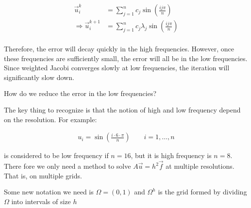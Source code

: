 \begin{align*}
  \vec{u}_i^{k} &= \sum_{j=1}^n c_j \sin \left( \frac{ij\pi}{n} \right) \\
  \Rightarrow \vec{u}_i^{k+1} &= \sum_{j=1}^n c_j \lambda_j \sin \left( \frac{ij\pi}{n} \right) \\
\end{align*}

Therefore, the error will decay quickly in the high frequencies. However, once
these frequencies are sufficiently small, the error will all be in the low
frequencies. Since weighted Jacobi converges slowly at low frequencies, the
iteration will significantly slow down.

\begin{displayquote}
How do we reduce the error in the low frequencies?
\end{displayquote}

The key thing to recognize is that the notion of high and low frequency depend
on the resolution. For example:

\begin{align*}
  u_i = \sin \left( \frac{i\cdot 6\cdot \pi}{n} \right) \qquad i=1, \ldots, n
\end{align*}

is considered to be low frequency if $n=16$, but it is high frequency is $n=8$.
There fore we only need a method to solve $A\vec{u}=h^2\vec{f}$ at multiple
resolutions. That is, on multiple grids.

Some new notation we need is $\Omega = (0, 1)$ and $\Omega^h$ is the grid formed
by dividing $\Omega$ into intervals of size $h$

\begin{center}
\end{center}

